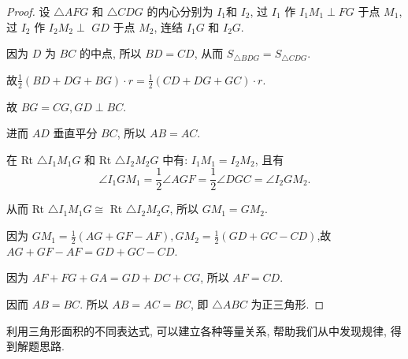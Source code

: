 \documentclass{March}
\begin{document}
\begin{proof}
	设 $\triangle A F G$ 和 $\triangle C D G$ 的内心分别为 $I_1$和 $I_2$, 过 $I_1$ 作 $I_1 M_1 \perp F G$ 于点 $M_1$, 过 $I_2$ 作 $I_2 M_2 \perp$ $G D$ 于点 $M_2$, 连结 $I_1 G$ 和 $I_2 G$.

	因为 $D$ 为 $B C$ 的中点, 所以 $B D=C D$, 从而 $S_{\triangle B D G}=S_{\triangle C D G}$.

	故$\frac{1}{2}(B D+D G+B G) \cdot r=\frac{1}{2}(C D+D G+G C) \cdot r$.

	故 $B G=C G, G D \perp B C$.

	进而 $A D$ 垂直平分 $B C$, 所以 $A B=A C$.

	在 Rt $\triangle I_1 M_1 G$ 和 Rt $\triangle I_2 M_2 G$ 中有: $I_1 M_1=I_2 M_2$, 且有
	$$
		\angle I_1 G M_1=\frac{1}{2} \angle A G F=\frac{1}{2} \angle D G C=\angle I_2 G M_2 .
	$$

	从而 Rt $\triangle I_1 M_1 G \cong$ Rt $\triangle I_2 M_2 G$, 所以 $G M_1=G M_2$.

	因为 $G M_1=\frac{1}{2}(A G+G F-A F), G M_2=\frac{1}{2}(G D+G C-C D)$,故 $A G+G F-A F=G D+G C-C D$.

	因为 $A F+F G+G A=G D+D C+C G$, 所以 $A F=C D$.

	因而 $A B=B C$. 所以 $A B=A C=B C$, 即 $\triangle A B C$ 为正三角形.
\end{proof}
\begin{note}
	利用三角形面积的不同表达式, 可以建立各种等量关系, 帮助我们从中发现规律, 得到解题思路.
\end{note}
\end{document}
